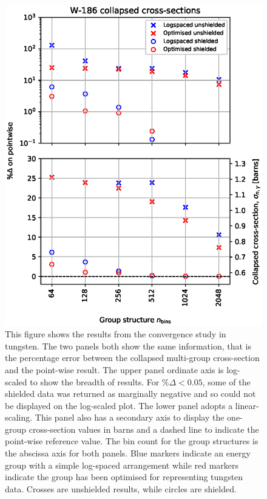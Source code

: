 \begin{figure}[H]
  \centering
  \includegraphics[width=0.9\linewidth]{W186_lin_log}
  \caption{This figure shows the results from the convergence study in tungsten. The two panels both show the same information, that is the percentage error between the collapsed multi-group cross-section and the point-wise result. The upper panel ordinate axis is log-scaled to show the breadth of results. For $\%\Delta < 0.05$, some of the shielded data was returned as marginally negative and so could not be displayed on the log-scaled plot. The lower panel adopts a linear-scaling. This panel also has a secondary axis to display the one-group cross-section values in barns and a dashed line to indicate the point-wise reference value. The bin count for the group structures is the abscissa axis for both panels. Blue markers indicate an energy group with a simple log-spaced arrangement while red markers indicate the group has been optimised for representing tungsten data. Crosses are unshielded results, while circles are shielded.}
  \label{fig:W186_convergence}
\end{figure}

